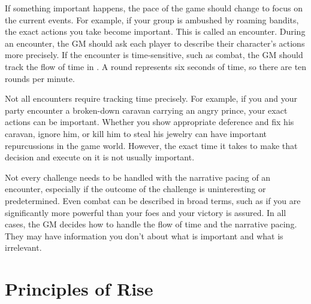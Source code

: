     If something important happens, the pace of the game should change to focus on the current events.
    For example, if your group is ambushed by roaming bandits, the exact actions you take become important.
    This is called an encounter.
    During an encounter, the GM should ask each player to describe their character's actions more precisely.
    If the encounter is time-sensitive, such as combat, the GM should track the flow of time in .
    A round represents six seconds of time, so there are ten rounds per minute.

    Not all encounters require tracking time precisely.
    For example, if you and your party encounter a broken-down caravan carrying an angry prince, your exact actions can be important.
    Whether you show appropriate deference and fix his caravan, ignore him, or kill him to steal his jewelry can have important repurcussions in the game world.
    However, the exact time it takes to make that decision and execute on it is not usually important.

    Not every challenge needs to be handled with the narrative pacing of an encounter, especially if the outcome of the challenge is uninteresting or predetermined.
    Even combat can be described in broad terms, such as if you are significantly more powerful than your foes and your victory is assured.
    In all cases, the GM decides how to handle the flow of time and the narrative pacing.
    They may have information you don't about what is important and what is irrelevant.

\section{Principles of Rise}

